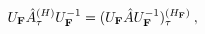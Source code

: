 \begin{equation} U_{\bf F} \hat A^{(H)}_\tau U^{-1}_{\bf F}= (U_{\bf F} \hat A U^{-1}_{\bf F})^{(H_{\bf F})}_{\tau}\:,
\end{equation}

